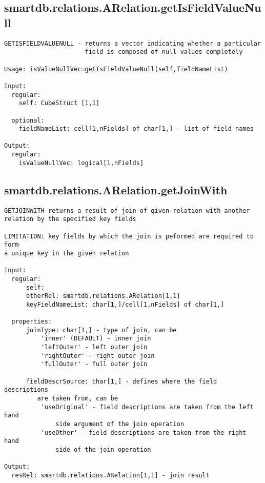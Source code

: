 \subsection{\texorpdfstring{smartdb.relations.ARelation.getIsFieldValueNull}{getIsFieldValueNull}}\label{method:smartdb.relations.ARelation.getIsFieldValueNull}
\begin{verbatim}
GETISFIELDVALUENULL - returns a vector indicating whether a particular
                      field is composed of null values completely

Usage: isValueNullVec=getIsFieldValueNull(self,fieldNameList)

Input:
  regular:
    self: CubeStruct [1,1]

  optional:
    fieldNameList: cell[1,nFields] of char[1,] - list of field names

Output:
  regular:
    isValueNullVec: logical[1,nFields]
\end{verbatim}
\subsection{\texorpdfstring{smartdb.relations.ARelation.getJoinWith}{getJoinWith}}\label{method:smartdb.relations.ARelation.getJoinWith}
\begin{verbatim}
GETJOINWITH returns a result of join of given relation with another
relation by the specified key fields

LIMITATION: key fields by which the join is peformed are required to form
a unique key in the given relation

Input:
  regular:
      self:
      otherRel: smartdb.relations.ARelation[1,1]
      keyFieldNameList: char[1,]/cell[1,nFields] of char[1,]

  properties:
      joinType: char[1,] - type of join, can be
          'inner' (DEFAULT) - inner join
          'leftOuter' - left outer join
          'rightOuter' - right outer join
          'fullOuter' - full outer join

      fieldDescrSource: char[1,] - defines where the field descriptions
         are taken from, can be
          'useOriginal' - field descriptions are taken from the left hand
              side argument of the join operation
          'useOther' - field descriptions are taken from the right hand
              side of the join operation

Output:
  resRel: smartdb.relations.ARelation[1,1] - join result
\end{verbatim}
